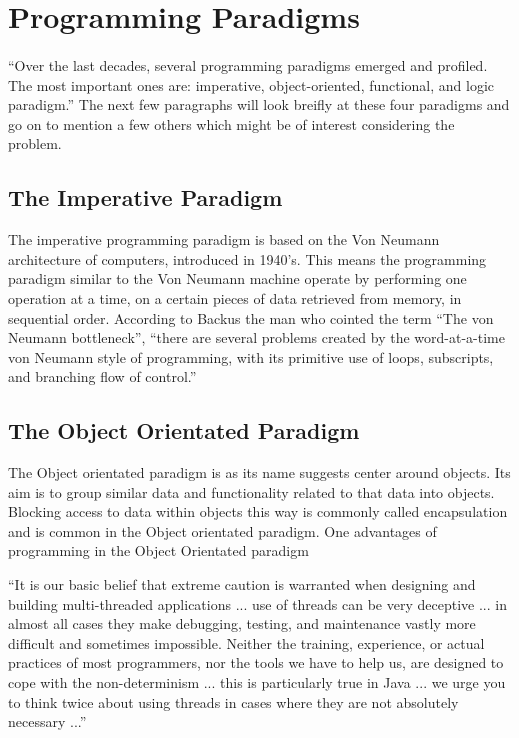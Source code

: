 \documentclass{report}
\begin{document}
\section{Programming Paradigms}
\paragraph{}``Over the last decades, several programming paradigms emerged and profiled. The most important ones are: imperative, object-oriented, functional, and logic paradigm.''\cite{Vujosevic2008} The next few paragraphs will look breifly at these four paradigms and go on to mention a few others which might be of interest considering the problem.

\subsection{The Imperative Paradigm}
The imperative programming paradigm is based on the Von Neumann architecture of computers, introduced in 1940’s. \cite{Vujosevic2008} This means the programming paradigm similar to the Von Neumann machine operate by performing one operation at a time, on a certain pieces of data retrieved from memory, in sequential order. According to Backus \cite{Backus1978} the man who cointed the term ``The von Neumann bottleneck'', ``there are several problems created by the word-at-a-time von Neumann style of programming, with its primitive use of loops, subscripts, and branching flow of control.''

\subsection{The Object Orientated Paradigm}
The Object orientated paradigm is as its name suggests center around objects. Its aim is to group similar data and functionality related to that data into objects. Blocking access to data within objects this way is commonly called encapsulation and is common in the Object orientated paradigm.
One advantages of programming in the Object Orientated paradigm %

``It is our basic belief that extreme caution is warranted when designing and building multi-threaded applications ... use of threads can be very deceptive ... in almost all cases they make debugging, testing, and maintenance vastly more difficult and sometimes impossible.  Neither the training, experience, or actual practices of most programmers, nor the tools we have to help us, are designed to cope with the non-determinism ... this is particularly true in Java ... we urge you to think twice about using threads in cases where they are not absolutely necessary ...''
\end{document}
